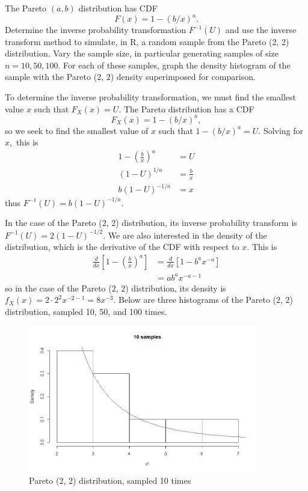 \documentclass{article}
\begin{document}
\begin{enumerate}
	\ii The Pareto $(a, b)$ distribution has CDF \[F(x)=1-(b/x)^a. \] Determine the inverse probability transformation $F^{-1}(U)$ and use the inverse transform method to simulate, in R, a random sample from the Pareto (2, 2) distribution. Vary the sample size, in particular generating samples of size $n=10, 50, 100.$ For each of these samples, graph the density histogram of the sample with the Pareto (2, 2) density superimposed for comparison.
		\begin{soln}
			To determine the inverse probability transformation, we must find the smallest value $x$ such that $F_X(x)=U.$ The Pareto distribution has a CDF \[F_X(x) = 1-(b/x)^a, \] so we seek to find the smallest value of $x$ such that $1-(b/x)^a=U.$ Solving for $x,$ this is 
			\begin{align*}
				1-\left( \frac{b}{x} \right)^a &= U \\
				(1-U)^{1/a} &= \frac{b}{x}  \\
				b(1-U)^{-1/a} &= x
			\end{align*} thus $F^{-1}(U)=\boxed{b(1-U)^{-1/a}.}$

			In the case of the Pareto (2, 2) distribution, its inverse probability transform is $F^{-1}(U)=2(1-U)^{-1/2}.$ We are also interested in the density of the distribution, which is the derivative of the CDF with respect to $x.$ This is 
			\begin{align*}
				\frac{d}{dx}\left[ 1-\left( \frac{b}{x} \right)^a \right] &= \frac{d}{dx}\left[ 1-b^a x^{-a} \right] \\
				&= ab^a x^{-a-1}
			\end{align*} so in the case of the Pareto (2, 2) distribution, its density is $f_X(x)=2\cdot2^2 x^{-2-1}=8x^{-3}.$ Below are three histograms of the Pareto (2, 2) distribution, sampled 10, 50, and 100 times.

			\begin{figure}[ht]
				\centering
				\includegraphics[width=10cm]{10Pareto.png}
				\caption{Pareto (2, 2) distribution, sampled 10 times}
			\end{figure}
			

\end{soln}
\end{enumerate}
\end{document}

